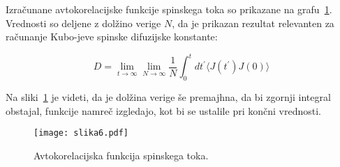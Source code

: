\documentclass[a4paper]{article}
\begin{document}
    Izračunane avtokorelacijske funkcije spinskega toka so prikazane na grafu~\ref{slika6}.
    Vrednosti so deljene z dolžino verige $N$, da je prikazan rezultat relevanten za računanje Kubo-jeve spinske
    difuzijske konstante:

    \begin{equation}\label{eq21}
        D = \lim_{t \to \infty} \lim_{N \to \infty}
        \frac{1}{N} \int_0^t dt^\prime \langle J(t^\prime)J(0) \rangle
    \end{equation}

    Na sliki~\ref{slika6} je videti, da je dolžina verige še premajhna, da bi zgornji integral obstajal, funkcije namreč
    izgledajo, kot bi se ustalile pri končni vrednosti.

    \begin{figure}
        \centering
        \texttt{[image: slika6.pdf]}
        \caption{Avtokorelacijska funkcija spinskega toka.}
        \label{slika6}
    \end{figure}
\end{document}
